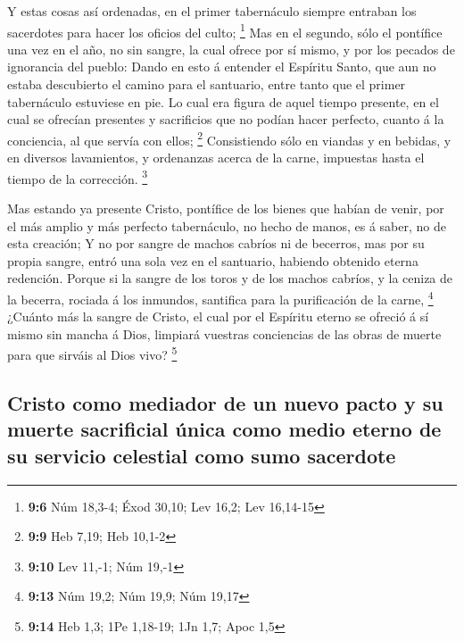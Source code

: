 Y estas cosas así ordenadas, en el primer tabernáculo
siempre entraban los sacerdotes para hacer los oficios del culto;
\footnote{\textbf{9:6} Núm 18,3-4; Éxod 30,10; Lev 16,2; Lev 16,14-15}
 Mas en el segundo, sólo el pontífice una vez en el año, no
sin sangre, la cual ofrece por sí mismo, y por los pecados de ignorancia
del pueblo:  Dando en esto á entender el Espíritu Santo, que
aun no estaba descubierto el camino para el santuario, entre tanto que
el primer tabernáculo estuviese en pie.  Lo cual era figura
de aquel tiempo presente, en el cual se ofrecían presentes y sacrificios
que no podían hacer perfecto, cuanto á la conciencia, al que servía con
ellos; \footnote{\textbf{9:9} Heb 7,19; Heb 10,1-2} 
Consistiendo sólo en viandas y en bebidas, y en diversos lavamientos, y
ordenanzas acerca de la carne, impuestas hasta el tiempo de la
corrección. \footnote{\textbf{9:10} Lev 11,-1; Núm 19,-1}

 Mas estando ya presente Cristo, pontífice de los bienes
que habían de venir, por el más amplio y más perfecto tabernáculo, no
hecho de manos, es á saber, no de esta creación;  Y no por
sangre de machos cabríos ni de becerros, mas por su propia sangre, entró
una sola vez en el santuario, habiendo obtenido eterna redención.
 Porque si la sangre de los toros y de los machos cabríos,
y la ceniza de la becerra, rociada á los inmundos, santifica para la
purificación de la carne, \footnote{\textbf{9:13} Núm 19,2; Núm 19,9;
  Núm 19,17}  ¿Cuánto más la sangre de Cristo, el cual por
el Espíritu eterno se ofreció á sí mismo sin mancha á Dios, limpiará
vuestras conciencias de las obras de muerte para que sirváis al Dios
vivo? \footnote{\textbf{9:14} Heb 1,3; 1Pe 1,18-19; 1Jn 1,7; Apoc 1,5}

\hypertarget{cristo-como-mediador-de-un-nuevo-pacto-y-su-muerte-sacrificial-uxfanica-como-medio-eterno-de-su-servicio-celestial-como-sumo-sacerdote}{%
\subsection{Cristo como mediador de un nuevo pacto y su muerte
sacrificial única como medio eterno de su servicio celestial como sumo
sacerdote}\label{cristo-como-mediador-de-un-nuevo-pacto-y-su-muerte-sacrificial-uxfanica-como-medio-eterno-de-su-servicio-celestial-como-sumo-sacerdote}}

